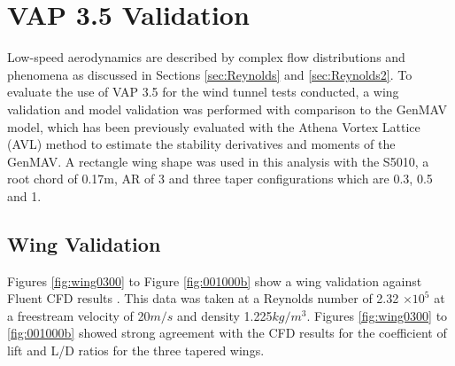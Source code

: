 \section{VAP 3.5 Validation}
Low-speed aerodynamics are described by complex flow distributions and phenomena as discussed in Sections \ref{sec:Reynolds} and \ref{sec:Reynolds2}. To evaluate the use of VAP 3.5 for the wind tunnel tests conducted, a wing validation and model validation was performed with comparison to the \acrshort{GenMAV} model, which has been previously evaluated with the Athena Vortex Lattice (\acrshort{AVL}) method to estimate the stability derivatives and moments of the \acrshort{GenMAV}. A rectangle wing shape was used in this analysis with the S5010, a root chord of 0.17m, \acrshort{AR} of 3 and three taper configurations which are 0.3, 0.5 and 1.


\subsection{Wing Validation}
 Figures \ref{fig:wing0300} to Figure \ref{fig:001000b} show a wing validation against Fluent \acrshort{CFD} results \cite{Trips}. This data was taken at a Reynolds number of 2.32 $\times 10^{5}$ at a freestream velocity of 20$m/s$ and density 1.225$kg/m^3$. Figures \ref{fig:wing0300} to \ref{fig:001000b} showed strong agreement with the \acrshort{CFD} results for the coefficient of lift and L/D ratios for the three tapered wings. 

